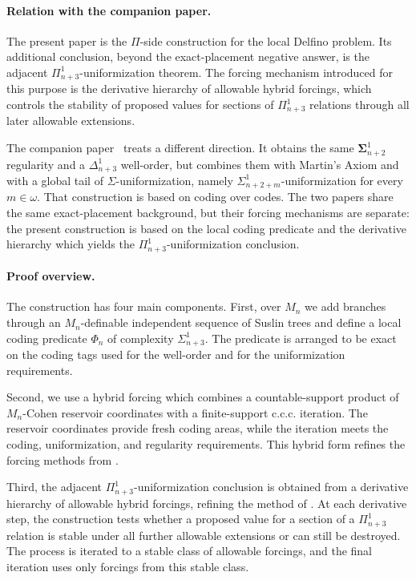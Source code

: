 \documentclass[a4paper,11pt]{article}
\begin{document}
\paragraph{Relation with the companion paper.}
The present paper is the $\Pi$-side construction for the local Delfino
problem.  Its additional conclusion, beyond the exact-placement negative
answer, is the adjacent $\Pi^1_{n+3}$-uniformization theorem.  The forcing
mechanism introduced for this purpose is the derivative hierarchy of
allowable hybrid forcings, which controls the stability of proposed values
for sections of $\Pi^1_{n+3}$ relations through all later allowable
extensions.

The companion paper~\cite{HoffelnerLocalDelfinoI} treats a different
direction.  It obtains the same $\boldsymbol\Sigma^1_{n+2}$ regularity and
a $\Delta^1_{n+3}$ well-order, but combines them with Martin's Axiom and
with a global tail of $\Sigma$-uniformization, namely
$\Sigma^1_{n+2+m}$-uniformization for every $m\in\omega$.  That
construction is based on coding over codes.  The two papers share the same
exact-placement background, but their forcing mechanisms are separate: the
present construction is based on the local coding predicate and the
derivative hierarchy which yields the $\Pi^1_{n+3}$-uniformization
conclusion.


\paragraph{Proof overview.}
The construction has four main components.  First, over $M_n$ we add branches
through an $M_n$-definable independent sequence of Suslin trees and define a
local coding predicate $\Phi_n$ of complexity $\Sigma^1_{n+3}$.  The predicate
is arranged to be exact on the coding tags used for the well-order and for
the uniformization requirements.

Second, we use a hybrid forcing which combines a countable-support product of
$M_n$-Cohen reservoir coordinates with a finite-support c.c.c. iteration.
The reservoir coordinates provide fresh coding areas, while the iteration
meets the coding, uniformization, and regularity requirements.  This hybrid
form refines the forcing methods from \cite{HOFFELNER2023103292}.

Third, the adjacent $\Pi^1_{n+3}$-uniformization conclusion is obtained from
a derivative hierarchy of allowable hybrid forcings, refining the method of
\cite{Pi_Uniformization}.  At each derivative step, the construction tests
whether a proposed value for a section of a $\Pi^1_{n+3}$ relation is stable
under all further allowable extensions or can still be destroyed.  The
process is iterated to a stable class of allowable forcings, and the final
iteration uses only forcings from this stable class.
\end{document}
